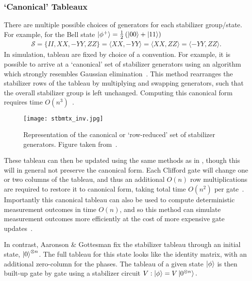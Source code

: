 \subsubsection*{`Canonical' Tableaux}
There are multiple possible choices of generators for each stabilizer group/state. For example, for the Bell state $\ket{\phi^{+}}=\frac{1}{2}\left(\ket{00}+\ket{11}\right)$
\begin{align}
    \mathcal{S} = \{II, XX, -YY, ZZ\} = \langle XX,-YY\rangle = \langle XX, ZZ\rangle = \langle -YY,ZZ\rangle.
\end{align}
In simulation, tableau are fixed by choice of a convention. For example, it is possible to arrive at a `canonical' set of stabilizer generators using an algorithm which strongly resembles Gaussian elimination~\cite{Garcia2012}. This method rearranges the stabilizer rows of the tableau by multiplying and swapping generators, such that the overall stabilizer group is left unchanged. Computing this canonical form requires  time $O(n^{3})$~\cite{Garcia2012}.
\begin{figure}[H]
    \centering
    \texttt{[image: stbmtx\_inv.jpg]}
    \caption{Representation of the canonical or `row-reduced' set of stabilizer generators. Figure taken from~\cite{Garcia2012}.}
\label{fig:canoncialtableau}
\end{figure}
These tableau can then be updated using the same methods as in \cite{Aaronson2004}, though this will in general not preserve the canonical form. Each Clifford gate will change one or two columns of the tableau, and thus an additional $O(n)$ row multiplications are required to restore it to canonical form, taking total time $O(n^{2})$ per gate~\cite{Garcia2015}.
Importantly this canonical tableau can also be used to compute deterministic measurement outcomes in time $O(n)$, and so this method can simulate measurement outcomes more efficiently at the cost of more expensive gate updates~\cite{Garcia2015}.\par
In contrast, Aaronson \& Gottesman fix the stabilizer tableau through an initial state, $\ket{0}^{\otimes n}$. The full tableau for this state looks like the identity matrix, with an additional zero-column for the phases. The tableau of a given state $\ket{\phi}$ is then built-up gate by gate using a stabilizer circuit $V:\ket{\phi}=V\ket{0^{\otimes n}}.$
